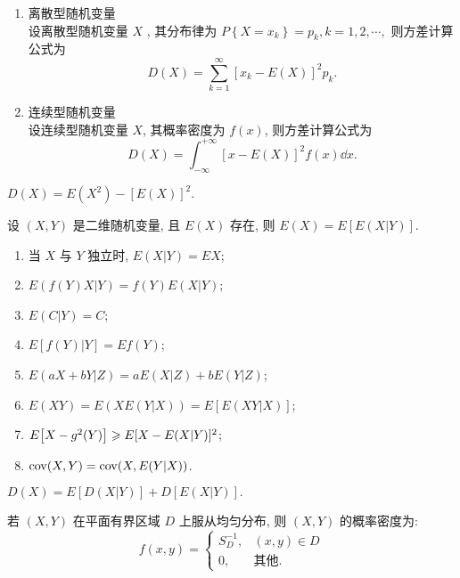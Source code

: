 \begin{enumerate}[label=(\arabic{*})]
    \item 离散型随机变量\\
    设离散型随机变量 $ X $ , 其分布律为 $P\left\{X=x_{k}\right\}=p_{k}, k=1,2, \cdots,$
    则方差计算公式为
    $$D(X)=\sum_{k=1}^{\infty}\left[x_{k}-E(X)\right]^{2} p_{k}.$$
    \item 连续型随机变量\\
    设连续型随机变量 $ X $, 其概率密度为 $ f(x) $, 则方差计算公式为
    $$D(X)=\int_{-\infty}^{+\infty}[x-E(X)]^{2} f(x) \dd  x .$$
\end{enumerate}

\begin{theorem}[方差与期望的联系]
    $D(X)=E\left(X^{2}\right)-[E(X)]^{2} .$
\end{theorem}

\begin{theorem}[重期望公式]
    设 $(X,Y)$ 是二维随机变量, 且 $E(X)$ 存在, 则 
    $E(X)=E[E(X|Y)].$
\end{theorem}

\begin{inference}[条件期望的性质]
    \label{cqwgstl}
    \begin{enumerate}[label=(\arabic{*})]
        \item 当 $X$ 与 $Y$ 独立时, $E(X|Y)=EX$;
        \item $E(f(Y)X|Y)=f(Y)E(X|Y)$;
        \item $E(C|Y)=C$;
        \item $E[f(Y)|Y]=Ef(Y)$;
        \item $E(aX+bY|Z)=aE(X|Z)+bE(Y|Z)$;
        \item $E(XY)=E(XE(Y|X))=E[E(XY|X)]$;
        \item $E\qty[X-g^2(Y)]\geqslant E[X-E(X|Y)]^2$;
        \item $\mathrm{cov}(X,Y)=\mathrm{cov}(X,E(Y|X))$.
    \end{enumerate}
\end{inference}

\begin{theorem}[全方差公式]
    \label{qfcgs}
    $D(X)=E[D(X|Y)]+D[E(X|Y)].$
\end{theorem}

\begin{theorem}[二维均匀分布的随机变量的概率密度]
    若 $(X,Y)$ 在平面有界区域 $D$ 上服从均匀分布, 则 $(X,Y)$ 的概率密度为:
    $$f(x,y)=\begin{cases}
            S_D^{-1}, & (x,y)\in D   \\
            0,        & \text{其他}.
        \end{cases}$$
\end{theorem}

